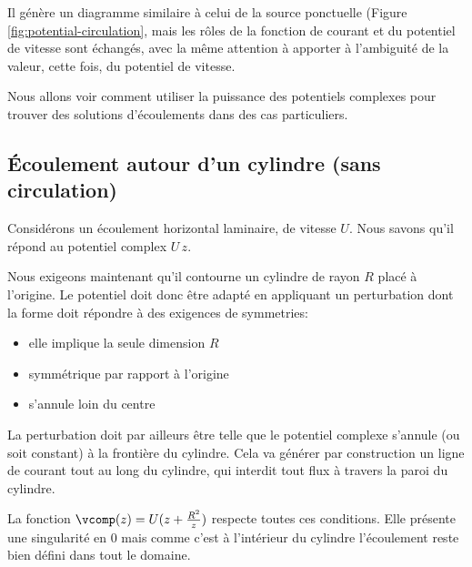 Il génère un diagramme similaire à celui de la source ponctuelle (Figure \ref{fig:potential-circulation}, mais les rôles de la fonction de courant et du potentiel de vitesse sont échangés, avec la même attention à apporter à l'ambiguité de la valeur, cette fois, du potentiel de vitesse. 


%
%
%
%

Nous allons voir comment utiliser la puissance des potentiels complexes pour trouver des solutions d'écoulements dans des cas particuliers. 

\subsection{Écoulement autour d'un cylindre (sans circulation)}

Considérons un écoulement horizontal laminaire, de vitesse $U$. Nous savons qu'il répond au potentiel complex $U\,z$. 

Nous exigeons maintenant qu'il contourne un cylindre de rayon $R$ placé à l'origine. Le potentiel doit donc être adapté en appliquant un perturbation dont la forme doit répondre à des exigences de symmetries:

\begin{itemize}
  \item elle implique la seule dimension $R$
  \item symmétrique par rapport à l'origine
  \item s'annule loin du centre
\end{itemize}

La perturbation doit par ailleurs être telle que le potentiel complexe s'annule (ou soit constant) à la frontière du cylindre. Cela va générer par construction un ligne de courant tout au long du cylindre, qui interdit tout flux à travers la paroi du cylindre. 

La fonction $\vcomp(z) = U ( z + \frac{R^2}{z})$ respecte toutes ces conditions. Elle présente une singularité en $0$ mais comme c'est à l'intérieur du cylindre l'écoulement reste bien défini dans tout le domaine. 

